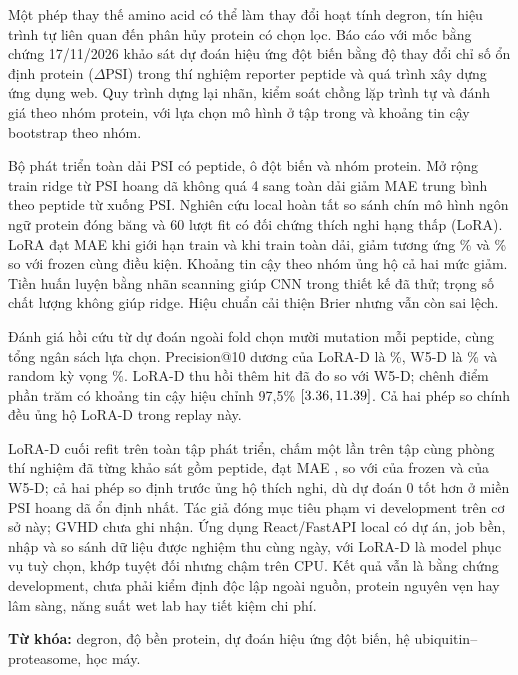 \begin{otherlanguage}{vietnamese}
Một phép thay thế amino acid có thể làm thay đổi hoạt tính degron, tín hiệu trình tự liên quan đến
phân hủy protein có chọn lọc. Báo cáo với mốc bằng chứng 17/11/2026 khảo sát dự đoán hiệu ứng đột biến
bằng độ thay đổi chỉ số ổn định protein ($\Delta$PSI) trong thí nghiệm reporter peptide và quá trình
xây dựng ứng dụng web.
Quy trình dựng lại nhãn, kiểm soát chồng lặp trình tự và đánh giá theo nhóm protein, với lựa chọn
mô hình ở tập trong và khoảng tin cậy bootstrap theo nhóm.

Bộ phát triển toàn dải PSI có \nVthreeNPeptides{} peptide, \nVthreeNCells{} ô đột biến và
\nVthreeNGroups{} nhóm protein. Mở rộng train ridge từ PSI hoang dã không quá 4 sang toàn dải
giảm MAE trung bình theo peptide từ \nVthreeRidgeB{} xuống \nVthreeRidgeD{} PSI.
Nghiên cứu local hoàn tất so sánh chín mô hình ngôn ngữ protein đóng băng và 60 lượt fit
có đối chứng thích nghi hạng thấp (LoRA). LoRA đạt MAE
\nCampaignLoraB{} khi giới hạn train và \nCampaignLoraD{} khi train toàn dải, giảm tương ứng
\nCampaignGainB\% và \nCampaignGainD\% so với frozen cùng điều kiện. Khoảng tin cậy theo nhóm
ủng hộ cả hai mức giảm. Tiền huấn luyện bằng nhãn scanning giúp CNN trong thiết kế đã thử;
trọng số chất lượng không giúp ridge. Hiệu chuẩn cải thiện Brier nhưng vẫn còn sai lệch.

Đánh giá hồi cứu từ dự đoán ngoài fold chọn mười mutation mỗi peptide, cùng tổng ngân sách
\nPrioritySelections{} lựa chọn. Precision@10 dương của LoRA-D là \nPriorityLoraPrecision\%,
W5-D là \nPriorityWfivePrecision\% và random kỳ vọng \nPriorityRandomPrecision\%.
LoRA-D thu hồi thêm \nPriorityExtraHits{} hit đã đo so với W5-D; chênh
\nPriorityDeltaWfive{} điểm phần trăm có khoảng tin cậy hiệu chỉnh 97,5\%
$[3.36, 11.39]{}$. Cả hai phép so chính đều ủng hộ LoRA-D trong replay này.

LoRA-D cuối refit trên toàn tập phát triển, chấm một lần trên tập cùng phòng thí nghiệm đã từng
khảo sát gồm \nTPeptides{} peptide, đạt MAE \nTLoraMae{}, so với \nTFrozenMae{} của frozen và
\nTWfiveMae{} của W5-D; cả hai phép so định trước ủng hộ thích nghi, dù dự đoán 0 tốt hơn ở miền PSI
hoang dã ổn định nhất. Tác giả đóng mục tiêu phạm vi development trên cơ sở này; GVHD chưa ghi nhận.
Ứng dụng React/FastAPI local có dự án, job bền, nhập và so sánh dữ liệu được nghiệm thu cùng ngày,
với LoRA-D là model phục vụ tuỳ chọn, khớp tuyệt đối nhưng chậm trên CPU. Kết quả vẫn là bằng chứng
development, chưa phải kiểm định độc lập ngoài nguồn, protein nguyên vẹn hay lâm sàng, năng suất
wet lab hay tiết kiệm chi phí.

\par\vspace{6bp}\noindent\textbf{Từ khóa:} degron, độ bền protein, dự đoán hiệu ứng đột biến, hệ ubiquitin--proteasome, học máy.
\end{otherlanguage}
